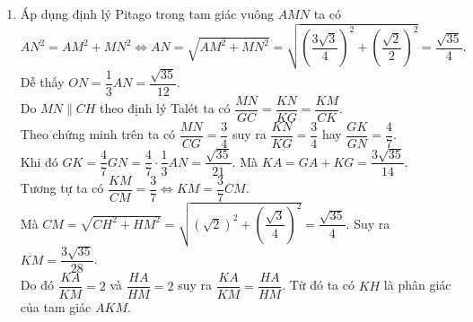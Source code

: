 \begin{ex}
{\begin{enumerate}
\begin{align*}
&= \left(BH + CH\right)^2 - 2 BH\cdot CH - DE^2 + 3AH^2\\
&= BC^2 - 2AH^2 - AH^2 + 3AH^2 = BC^2
\end{align*}
Vậy đẳng thức được chứng minh.
\item  
{}	
Áp dụng định lý Pitago trong tam giác vuông $AMN$ ta có
$$AN^2 = AM^2 + MN^2 \Leftrightarrow AN = \sqrt{AM^2 + MN^2} = \sqrt{\left(\dfrac{3\sqrt{3}}{4}\right)^2 +  \left(\dfrac{\sqrt{2}}{2}\right)^2} = \dfrac{\sqrt{35}}{4}.$$
Dễ thấy $ON = \dfrac{1}{3}AN = \dfrac{\sqrt{35}}{12}$.\\
Do $MN\parallel CH$ theo định lý Talét ta có $\dfrac{MN}{GC} = \dfrac{KN}{KG} = \dfrac{KM}{CK}$.\\
 Theo chứng minh trên ta có $\dfrac{MN}{CG} = \dfrac{3}{4}$ suy ra $\dfrac{KN}{KG} = \dfrac{3}{4}$ hay $\dfrac{GK}{GN} = \dfrac{4}{7}$.\\
 Khi đó $GK = \dfrac{4}{7}GN = \dfrac{4}{7}\cdot \dfrac{1}{3}AN = \dfrac{\sqrt{35}}{21}$. Mà $KA = GA + KG = \dfrac{3\sqrt{35}}{14}$.\\
Tương tự  ta có $\dfrac{KM}{CM} = \dfrac{3}{7}\Leftrightarrow KM = \dfrac{3}{7}CM$.\\
 Mà $CM = \sqrt{CH^2 + HM^2}  = \sqrt{\left(\sqrt{2}\right)^2 + \left(\dfrac{\sqrt{3}}{4}\right)^2} = \dfrac{\sqrt{35}}{4}$. Suy ra $KM = \dfrac{3\sqrt{35}}{28}$.\\
 Do đó $\dfrac{KA}{KM} = 2$ và $\dfrac{HA}{HM} = 2$ suy ra $\dfrac{KA}{KM} = \dfrac{HA}{HM}$. Từ đó ta có $KH$ là phân giác của tam giác $AKM$. 
\end{enumerate}

	}
\end{ex}

